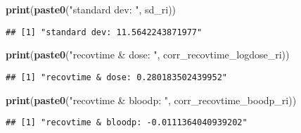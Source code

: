 \documentclass[
]{article}
\newenvironment{Shaded}{\begin{snugshade}}{\end{snugshade}}
\newcommand{\DataTypeTok}[1]{\textcolor[rgb]{0.13,0.29,0.53}{#1}}
\newcommand{\DecValTok}[1]{\textcolor[rgb]{0.00,0.00,0.81}{#1}}
\newcommand{\KeywordTok}[1]{\textcolor[rgb]{0.13,0.29,0.53}{\textbf{#1}}}
\newcommand{\NormalTok}[1]{#1}
\newcommand{\OperatorTok}[1]{\textcolor[rgb]{0.81,0.36,0.00}{\textbf{#1}}}
\newcommand{\OtherTok}[1]{\textcolor[rgb]{0.56,0.35,0.01}{#1}}
\newcommand{\StringTok}[1]{\textcolor[rgb]{0.31,0.60,0.02}{#1}}
\begin{document}
\begin{Shaded}
\begin{Highlighting}[]
\KeywordTok{print}\NormalTok{(}\KeywordTok{paste0}\NormalTok{(}\StringTok{"standard dev: "}\NormalTok{, sd_ri))}
\end{Highlighting}
\end{Shaded}

\begin{verbatim}
## [1] "standard dev: 11.5642243871977"
\end{verbatim}

\begin{Shaded}
\begin{Highlighting}[]
\KeywordTok{print}\NormalTok{(}\KeywordTok{paste0}\NormalTok{(}\StringTok{"recovtime & dose: "}\NormalTok{, corr_recovtime_logdose_ri))}
\end{Highlighting}
\end{Shaded}

\begin{verbatim}
## [1] "recovtime & dose: 0.280183502439952"
\end{verbatim}

\begin{Shaded}
\begin{Highlighting}[]
\KeywordTok{print}\NormalTok{(}\KeywordTok{paste0}\NormalTok{(}\StringTok{"recovtime & bloodp: "}\NormalTok{, corr_recovtime_boodp_ri))}
\end{Highlighting}
\end{Shaded}

\begin{verbatim}
## [1] "recovtime & bloodp: -0.0111364040939202"
\end{verbatim}

\begin{Shaded}
\end{Shaded}
\end{document}
